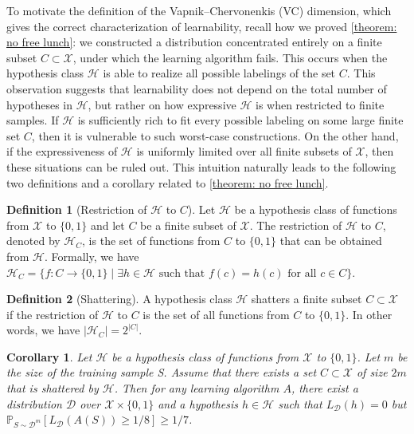 \documentclass[openany, amssymb, psamsfonts]{amsart}
\newtheorem{cor}{Corollary}[section]
\theoremstyle{definition}
\newtheorem{defn}{Definition}[section]
\numberwithin{equation}{section}
\begin{document}
To motivate the definition of the Vapnik--Chervonenkis (VC) dimension, which gives the correct characterization of learnability, recall how we proved \autoref{theorem: no free lunch}: we constructed a distribution concentrated entirely on a finite subset $C \subset \mathcal{X}$, under which the learning algorithm fails. This occurs when the hypothesis class $\mathcal{H}$ is able to realize all possible labelings of the set $C$. This observation suggests that learnability does not depend on the total number of hypotheses in $\mathcal{H}$, but rather on how expressive $\mathcal{H}$ is when restricted to finite samples. If $\mathcal{H}$ is sufficiently rich to fit every possible labeling on some large finite set $C$, then it is vulnerable to such worst-case constructions. On the other hand, if the expressiveness of $\mathcal{H}$ is uniformly limited over all finite subsets of $\mathcal{X}$, then these situations can be ruled out. This intuition naturally leads to the following two definitions and a corollary related to \autoref{theorem: no free lunch}.

\begin{defn}[Restriction of $\mathcal{H}$ to $C$] \label{definition: restriction of H to C}
Let $\mathcal{H}$ be a hypothesis class of functions from $\mathcal{X}$ to $\{0,1\}$ and let $C$ be a finite subset of $\mathcal{X}$. The restriction of $\mathcal{H}$ to $C$, denoted by $\mathcal{H}_C$, is the set of functions from $C$ to $\{0,1\}$ that can be obtained from $\mathcal{H}$. Formally, we have $\mathcal{H}_C = \{f \colon C \to \{0,1\} \mid \exists h \in \mathcal{H} \text{ such that } f(c)=h(c) \text{ for all } c \in C\}$.
\end{defn}

\begin{defn}[Shattering]\label{definition: shattering}
A hypothesis class $\mathcal{H}$ shatters a finite subset $C \subset \mathcal{X}$ if the restriction of $\mathcal{H}$ to $C$ is the set of all functions from $C$ to $\{0,1\}$. In other words, we have $|\mathcal{H}_C| = 2^{|C|}$.
\end{defn}

\begin{cor}\label{corollary: shattering}
Let $\mathcal{H}$ be a hypothesis class of functions from $\mathcal{X}$ to $\{0,1\}$. Let $m$ be the size of the training sample S. Assume that there exists a set $C \subset \mathcal{X}$ of size $2m$ that is shattered by $\mathcal{H}$. Then for any learning algorithm $A$, there exist a distribution $\mathcal{D}$ over $\mathcal{X} \times \{0,1\}$ and a hypothesis $h \in \mathcal{H}$ such that $L_{\mathcal{D}}(h) = 0$ but $\mathbb{P}_{S \sim \mathcal{D}^m}[L_{\mathcal{D}}(A(S)) \geq 1/8] \geq 1/7$.
\end{cor}
\end{document}
